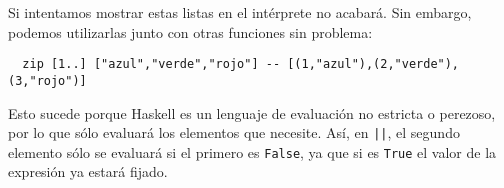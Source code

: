Si intentamos mostrar estas listas en el intérprete no acabará. Sin embargo, podemos utilizarlas
junto con otras funciones sin problema:

\begin{lstlisting}
  zip [1..] ["azul","verde","rojo"] -- [(1,"azul"),(2,"verde"),(3,"rojo")]
\end{lstlisting}

Esto sucede porque Haskell es un lenguaje de evaluación no estricta o perezoso, por lo que sólo evaluará
los elementos que necesite. Así, en \texttt{||}, el segundo elemento sólo se evaluará si el
primero es \texttt{False}, ya que si es \texttt{True} el valor de la expresión ya estará fijado.
